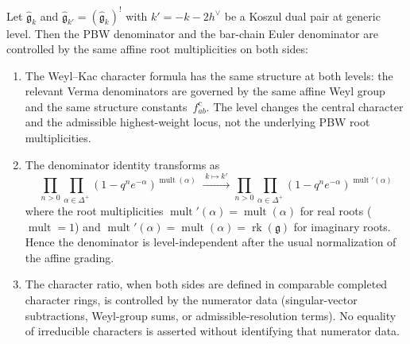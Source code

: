 \begin{proposition}
\label{prop:character-koszul-duality}
Let $\widehat{\mathfrak{g}}_k$ and
$\widehat{\mathfrak{g}}_{k'} = (\widehat{\mathfrak{g}}_k)^!$ with
$k' = -k - 2h^\vee$ be a Koszul dual pair at generic level. Then
the PBW denominator and the bar-chain Euler denominator are controlled
by the same affine root multiplicities on both sides:
\begin{enumerate}[label=\textup{(\roman*)}]
\item The Weyl--Kac character formula has the same structure at both
 levels: the relevant Verma denominators are governed by the same
 affine Weyl group and the same structure constants~$f_{ab}^c$.
 The level changes the central character and the admissible
 highest-weight locus, not the underlying PBW root multiplicities.
\item The denominator identity transforms as
 \[
 \prod_{n > 0} \prod_{\alpha \in \Delta^+}
 (1 - q^n e^{-\alpha})^{\operatorname{mult}(\alpha)}
 \;\xrightarrow{\;k \mapsto k'\;}
 \prod_{n > 0} \prod_{\alpha \in \Delta^+}
 (1 - q^n e^{-\alpha})^{\operatorname{mult}'(\alpha)}
 \]
 where the root multiplicities $\operatorname{mult}'(\alpha) =
 \operatorname{mult}(\alpha)$ for real roots
 \textup{(}$\operatorname{mult} = 1$\textup{)} and
 $\operatorname{mult}'(\alpha) = \operatorname{mult}(\alpha) =
 \operatorname{rk}(\mathfrak{g})$ for imaginary roots.
 Hence the denominator is level-independent after the usual
 normalization of the affine grading.
\item The character ratio, when both sides are defined in comparable
 completed character rings, is controlled by the numerator data
 \textup{(}singular-vector subtractions, Weyl-group sums, or
 admissible-resolution terms\textup{)}. No equality of irreducible
 characters is asserted without identifying that numerator data.
\end{enumerate}
\end{proposition}


